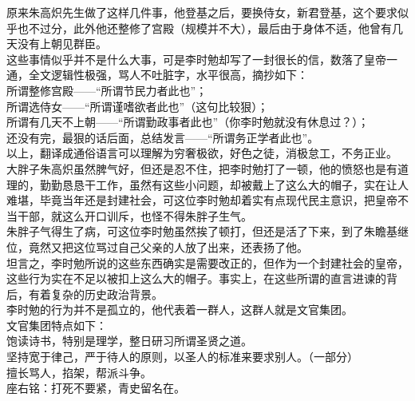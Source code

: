 \begin{multicols}{\theparacolNo}
原来朱高炽先生做了这样几件事，他登基之后，要换侍女，新君登基，这个要求似乎也不过分，此外他还整修了宫殿（规模并不大），最后由于身体不适，他曾有几天没有上朝见群臣。\\

这些事情似乎并不是什么大事，可是李时勉却写了一封很长的信，数落了皇帝一通，全文逻辑性极强，骂人不吐脏字，水平很高，摘抄如下：\\

所谓整修宫殿——“所谓节民力者此也”；\\

所谓选侍女——“所谓谨嗜欲者此也”（这句比较狠）；\\

所谓有几天不上朝——“所谓勤政事者此也”（你李时勉就没有休息过？）；\\

还没有完，最狠的话后面，总结发言——“所谓务正学者此也”。\\

以上，翻译成通俗语言可以理解为穷奢极欲，好色之徒，消极怠工，不务正业。\\

大胖子朱高炽虽然脾气好，但还是忍不住，把李时勉打了一顿，他的愤怒也是有道理的，勤勤恳恳干工作，虽然有这些小问题，却被戴上了这么大的帽子，实在让人难堪，毕竟当年还是封建社会，可这位李时勉却着实有点现代民主意识，把皇帝不当干部，就这么开口训斥，也怪不得朱胖子生气。\\

朱胖子气得生了病，可这位李时勉虽然挨了顿打，但还是活了下来，到了朱瞻基继位，竟然又把这位骂过自己父亲的人放了出来，还表扬了他。\\

坦言之，李时勉所说的这些东西确实是需要改正的，但作为一个封建社会的皇帝，这些行为实在不足以被扣上这么大的帽子。事实上，在这些所谓的直言进谏的背后，有着复杂的历史政治背景。\\

李时勉的行为并不是孤立的，他代表着一群人，这群人就是文官集团。\\

文官集团特点如下：\\

饱读诗书，特别是理学，整日研习所谓圣贤之道。\\

坚持宽于律己，严于待人的原则，以圣人的标准来要求别人。（一部分）\\

擅长骂人，掐架，帮派斗争。\\

座右铭：打死不要紧，青史留名在。\\


\end{multicols}
